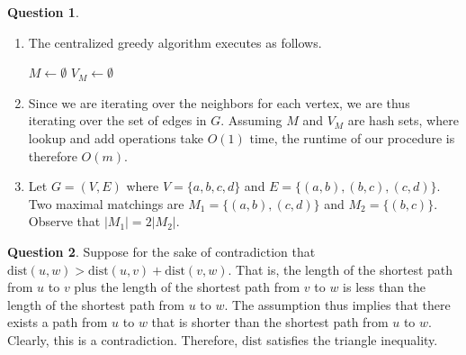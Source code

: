 \documentclass{amsart}
\theoremstyle{definition}
\newtheorem{question}{Question}
\newcommand{\dist}{\text{dist}}
\begin{document}
\begin{question}
  \begin{enumerate}[label={(\alph*)}]
    \item The centralized greedy algorithm executes as follows.
      \begin{algorithm}[h]
        \DontPrintSemicolon%
        $M \gets \emptyset$\;
        $V_M \gets \emptyset$ 
      \end{algorithm}
    \item Since we are iterating over the neighbors for each vertex, we are thus
      iterating over the set of edges in $G$. Assuming $M$ and $V_M$ are hash
      sets, where lookup and add operations take $O(1)$ time, the runtime of our
      procedure is therefore $O(m)$.
    \item Let $G = (V, E)$ where $V = \{a, b, c, d\}$ and $E = \{(a,b), (b,c),
      (c,d)\}$. Two maximal matchings are $M_1 = \{(a,b), (c,d)\}$ and $M_2 =
      \{(b,c)\}$. Observe that $|M_1| = 2 |M_2|$.
  \end{enumerate}
\end{question}

\begin{question}
  Suppose for the sake of contradiction that $\dist(u, w) > \dist(u, v) +
  \dist(v, w)$. That is, the length of the shortest path from $u$ to $v$ plus
  the length of the shortest path from $v$ to $w$ is less than the length of the
  shortest path from $u$ to $w$. The assumption thus implies that there exists a
  path from $u$ to $w$ that is shorter than the shortest path from $u$ to $w$.
  Clearly, this is a contradiction. Therefore, $\dist$ satisfies the triangle
  inequality.
\end{question}
\end{document}
